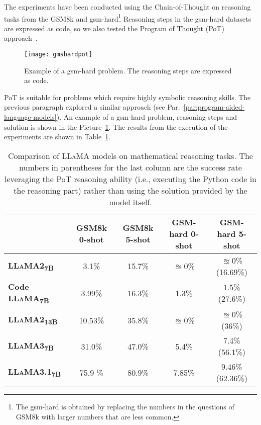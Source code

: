 The experiments have been conducted using the Chain-of-Thought on reasoning tasks from the GSM8k and gsm-hard\footnote{The gsm-hard is obtained by replacing the numbers in the questions of GSM8k with larger numbers that are less common.}
Reasoning steps in the gsm-hard datasets are expressed as code, so we also tested the Program of Thought (PoT) approach~\cite{chen2022program}.
\begin{figure}[h!]
	\centering
	\texttt{[image: gmshardpot]}
	\caption{Example of a gsm-hard problem. The reasoning steps are expressed as code.}
	\label{fig:pot-example}
\end{figure}
PoT is suitable for problems which require highly symbolic reasoning skills.
The previous paragraph explored a similar approach (see Par.~\ref{par:program-aided-language-models}).
An example of a gsm-hard problem, reasoning steps and solution is shown in the Picture~\ref{fig:pot-example}.
The results from the execution of the experiments are shown in Table~\ref{tab:llama-comparison}.

\begin{table}[h!]
	\centering
	\begin{tabularx}{\textwidth}{Xcccc}
		\toprule
		                                               & \textbf{GSM8k 0-shot} & \textbf{GSM8k 5-shot} & \textbf{GSM-hard 0-shot} & \textbf{GSM-hard 5-shot} \\
		\midrule
		\textbf{\textsc{LLaMA}2\textsubscript{7B}}     & 3.1\%                 & 15.7\%                & $\approxeq$0\%           & $\approxeq$0\% (16.69\%) \\
		\hline
		\textbf{Code \textsc{LLaMA}\textsubscript{7B}} & 3.99\%                & 16.3\%                & 1.3\%                    & 1.5\% (27.6\%)           \\
		\hline
		\textbf{\textsc{LLaMA}2\textsubscript{13B}}    & 10.53\%               & 35.8\%                & $\approxeq$0\%           & $\approxeq$0\%	 (36\%)   \\
		\hline
		\textbf{\textsc{LLaMA}3\textsubscript{7B}}     & 31.0\%                & 47.0\%                & 5.4\%                    & 7.4\% (56.1\%)           \\
		\hline
		\textbf{\textsc{LLaMA}3.1\textsubscript{7B}}   & 75.9 \%               & 80.9\%                & 7.85\%                   & 9.46\% (62.36\%)         \\
		\bottomrule
	\end{tabularx}
	\caption{Comparison of \textsc{LLaMA} models on mathematical reasoning tasks. The numbers in parentheses for the last column are the success rate leveraging the PoT reasoning ability (i.e., executing the Python code in the reasoning part) rather than using the solution provided by the model itself.}
	\label{tab:llama-comparison}
\end{table}

